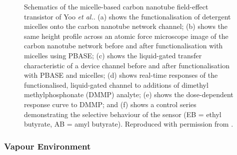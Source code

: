 \documentclass[
  a4paper,
]{scrbook}
\begin{document}
\begin{figure}
\caption{\label{fig-yoo-micelle}Schematics of the micelle-based carbon
nanotube field-effect transistor of Yoo \emph{et al.}. (a) shows the
functionalisation of detergent micelles onto the carbon nanotube network
channel; (b) shows the same height profile across an atomic force
microscope image of the carbon nanotube network before and after
functionalisation with micelles using PBASE; (c) shows the liquid-gated
transfer characteristic of a device channel before and after
functionalisation with PBASE and micelles; (d) shows real-time responses
of the functionalised, liquid-gated channel to additions of dimethyl
methylphosphonate (DMMP) analyte; (e) shows the dose-dependent response
curve to DMMP; and (f) shows a control series demonstrating the
selective behaviour of the sensor (EB = ethyl butyrate, AB = amyl
butyrate). Reproduced with permission from \autocite{Yoo2022}.}

\end{figure}

\hypertarget{vapour-environment}{%
\subsubsection*{Vapour Environment}\label{vapour-environment}}
\end{document}
